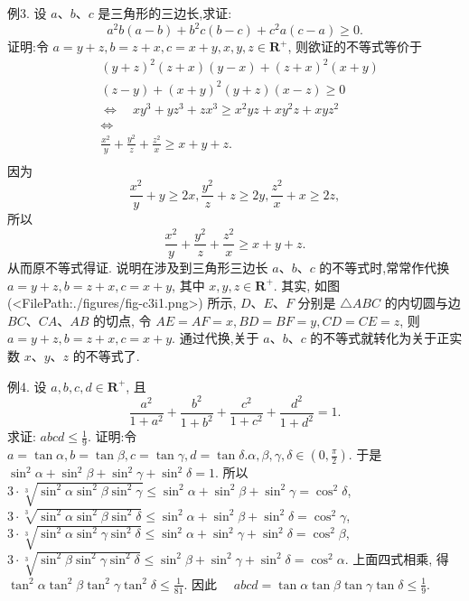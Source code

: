 例3. 设 $a 、 b 、 c$ 是三角形的三边长,求证:
$$
a^2 b(a-b)+b^2 c(b-c)+c^2 a(c-a) \geqslant 0 .
$$
证明:令 $a=y+z, b=z+x, c=x+y, x, y, z \in \mathbf{R}^{+}$, 则欲证的不等式等价于
$$
\begin{aligned}
& (y+z)^2(z+x)(y-x)+(z+x)^2(x+y) \\
& (z-y)+(x+y)^2(y+z)(x-z) \geqslant 0 \\
& \Leftrightarrow \quad x y^3+y z^3+z x^3 \geqslant x^2 y z+x y^2 z+x y z^2 \\
& \Leftrightarrow \\
& \frac{x^2}{y}+\frac{y^2}{z}+\frac{z^2}{x} \geqslant x+y+z . \\
&
\end{aligned}
$$
因为
$$
\frac{x^2}{y}+y \geqslant 2 x, \frac{y^2}{z}+z \geqslant 2 y, \frac{z^2}{x}+x \geqslant 2 z,
$$
所以
$$
\frac{x^2}{y}+\frac{y^2}{z}+\frac{z^2}{x} \geqslant x+y+z .
$$
从而原不等式得证.
说明在涉及到三角形三边长 $a 、 b 、 c$ 的不等式时,常常作代换 $a=y+z, b=z+x, c=x+y$, 其中 $x, y, z \in \mathbf{R}^{+}$. 其实, 如图(<FilePath:./figures/fig-c3i1.png>) 所示, $D 、 E 、 F$ 分别是 $\triangle A B C$ 的内切圆与边 $B C 、 C A 、 A B$ 的切点, 令 $A E=A F=x, B D=B F=y, C D=C E=z$, 则 $a=y+z, b=z+x, c=x+y$.
通过代换,关于 $a 、 b 、 c$ 的不等式就转化为关于正实数 $x 、 y 、 z$ 的不等式了.



例4. 设 $a, b, c, d \in \mathbf{R}^{+}$, 且
$$
\frac{a^2}{1+a^2}+\frac{b^2}{1+b^2}+\frac{c^2}{1+c^2}+\frac{d^2}{1+d^2}=1 .
$$
求证: $a b c d \leqslant \frac{1}{9}$.
证明:令 $a=\tan \alpha, b=\tan \beta, c=\tan \gamma, d=\tan \delta . \alpha, \beta, \gamma, \delta \in \left(0, \frac{\pi}{2}\right)$. 于是 $\sin ^2 \alpha+\sin ^2 \beta+\sin ^2 \gamma+\sin ^2 \delta=1$. 所以
$3 \cdot \sqrt[3]{\sin ^2 \alpha \sin ^2 \beta \sin ^2 \gamma} \leqslant \sin ^2 \alpha+\sin ^2 \beta+\sin ^2 \gamma=\cos ^2 \delta$,
$3 \cdot \sqrt[3]{\sin ^2 \alpha \sin ^2 \beta \sin ^2 \delta} \leqslant \sin ^2 \alpha+\sin ^2 \beta+\sin ^2 \delta=\cos ^2 \gamma$,
$3 \cdot \sqrt[3]{\sin ^2 \alpha \sin ^2 \gamma \sin ^2 \delta} \leqslant \sin ^2 \alpha+\sin ^2 \gamma+\sin ^2 \delta=\cos ^2 \beta$,
$3 \cdot \sqrt[3]{\sin ^2 \beta \sin ^2 \gamma \sin ^2 \delta} \leqslant \sin ^2 \beta+\sin ^2 \gamma+\sin ^2 \delta=\cos ^2 \alpha$.
上面四式相乘, 得 $\tan ^2 \alpha \tan ^2 \beta \tan ^2 \gamma \tan ^2 \delta \leqslant \frac{1}{81}$.
因此 $\quad a b c d=\tan \alpha \tan \beta \tan \gamma \tan \delta \leqslant \frac{1}{9}$.



